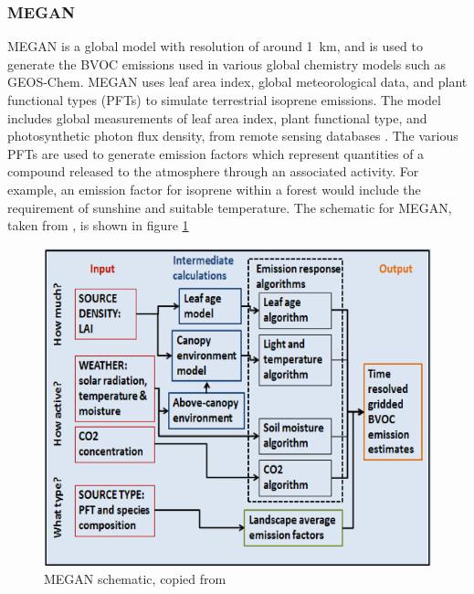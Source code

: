     \subsubsection{MEGAN}
      MEGAN is a global model with resolution of around 1~km, and is used to generate the BVOC emissions used in various global chemistry models such as GEOS-Chem.
      MEGAN uses leaf area index, global meteorological data, and plant functional types (PFTs) to simulate terrestrial isoprene emissions.
      The model includes global measurements of leaf area index, plant functional type, and photosynthetic photon flux density, from remote sensing databases \citep{Kefauver2014}.
      The various PFTs are used to generate emission factors which represent quantities of a compound released to the atmosphere through an associated activity.
      For example, an emission factor for isoprene within a forest would include the requirement of sunshine and suitable temperature.
      The schematic for MEGAN, taken from \citet{Megan_Website}, is shown in figure \ref{LR:Models:fig_megan_schematic}
      
      \begin{figure}[!htbp]
        \includegraphics[width=\textwidth]{Figures/MEGANmodel_img.jpg}
        \caption{MEGAN schematic, copied from \citet{Megan_Website}}
        \label{LR:Models:fig_megan_schematic}
      \end{figure}
      
